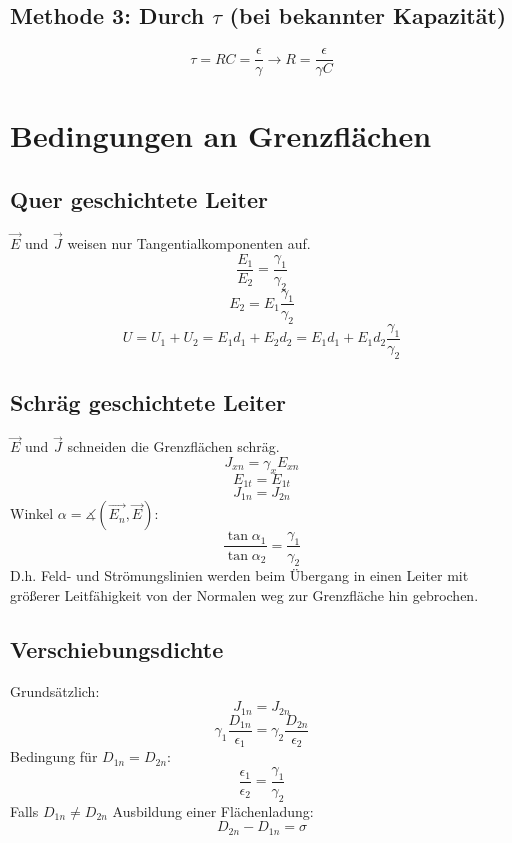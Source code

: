 \documentclass[12pt,a4paper]{article}
\begin{document}
\subsection{Methode 3: Durch $\tau$ (bei bekannter Kapazität)}
\[\tau = RC = \frac{\epsilon}{\gamma} \rightarrow R = \frac{\epsilon}{\gamma C}\]

\section{Bedingungen an Grenzflächen}
\subsection{Quer geschichtete Leiter}
$\vec{E}$ und $\vec{J}$ weisen nur Tangentialkomponenten auf.
\[\frac{E_1}{E_2} = \frac{\gamma_1}{\gamma_2}\]
\[E_2 = E_1\frac{\gamma_1}{\gamma_2}\]
\[U = U_1 + U_2 = E_1 d_1 + E_2 d_2 = E_1 d_1 + E_1 d_2\frac{\gamma_1}{\gamma_2}\]

\subsection{Schräg geschichtete Leiter}
$\vec{E}$ und $\vec{J}$ schneiden die Grenzflächen schräg.\\
\[J_{xn} = \gamma_x E_{xn}\]
\[E_{1t} = E_{1t}\]
\[J_{1n} = J_{2n}\]
Winkel $\alpha = \measuredangle{(\vec{E_n}, \vec{E})}$:
\[\frac{\tan\alpha_1}{\tan\alpha_2} = \frac{\gamma_1}{\gamma_2}\]
D.h. Feld- und Strömungslinien werden beim Übergang in einen  Leiter mit größerer Leitfähigkeit von der Normalen weg zur Grenzfläche hin gebrochen.

\subsection{Verschiebungsdichte}
Grundsätzlich:
\[J_{1n} = J_{2n}\]
\[\gamma_1 \frac{D_{1n}}{\epsilon_1} = \gamma_2 \frac{D_{2n}}{\epsilon_2}\]
Bedingung für $D_{1n} = D_{2n}$:
\[\frac{\epsilon_1}{\epsilon_2} = \frac{\gamma_1}{\gamma_2}\]
Falls $D_{1n} \neq D_{2n}$ Ausbildung einer Flächenladung:
\[D_{2n} - D_{1n} = \sigma\]
\end{document}

